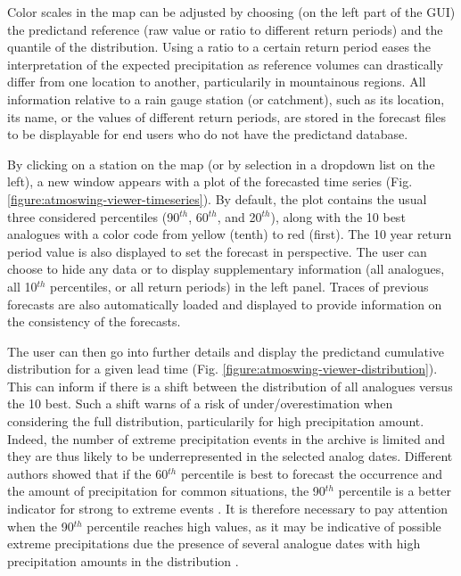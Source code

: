\documentclass[review]{elsarticle}
\begin{document}
Color scales in the map can be adjusted by choosing (on the left part of the GUI) the predictand reference (raw value or ratio to different return periods) and the quantile of the distribution. Using a ratio to a certain return period eases the interpretation of the expected precipitation as reference volumes can drastically differ from one location to another, particularily in mountainous regions. All information relative to a rain gauge station (or catchment), such as its location, its name, or the values of different return periods, are stored in the forecast files to be displayable for end users who do not have the predictand database.

By clicking on a station on the map (or by selection in a dropdown list on the left), a new window appears with a plot of the forecasted time series (Fig. \ref{figure:atmoswing-viewer-timeseries}). By default, the plot contains the usual three considered percentiles (90$^{th}$, 60$^{th}$, and 20$^{th}$), along with the 10 best analogues with a color code from yellow (tenth) to red (first). The 10 year return period value is also displayed to set the forecast in perspective. The user can choose to hide any data or to display supplementary information (all analogues, all 10$^{th}$ percentiles, or all return periods) in the left panel. Traces of previous forecasts are also automatically loaded and displayed to provide information on the consistency of the forecasts. 

The user can then go into further details and display the predictand cumulative distribution for a given lead time (Fig. \ref{figure:atmoswing-viewer-distribution}). This can inform if there is a shift between the distribution of all analogues versus the 10 best. Such a shift warns of a risk of under/overestimation when considering the full distribution, particularily for high precipitation amount. Indeed, the number of extreme precipitation events in the archive is limited and they are thus likely to be underrepresented in the selected analog dates. Different authors showed that if the 60$^{th}$ percentile is best to forecast the occurrence and the amount of precipitation for common situations, the 90$^{th}$ percentile is a better indicator for strong to extreme events \citep{Djerboua2001, Bontron2004, Marty2010}. It is therefore necessary to pay attention when the 90$^{th}$ percentile reaches high values, as it may be indicative of possible extreme precipitations due the presence of several analogue dates with high precipitation amounts in the distribution \citep{Djerboua2001}.
\end{document}
